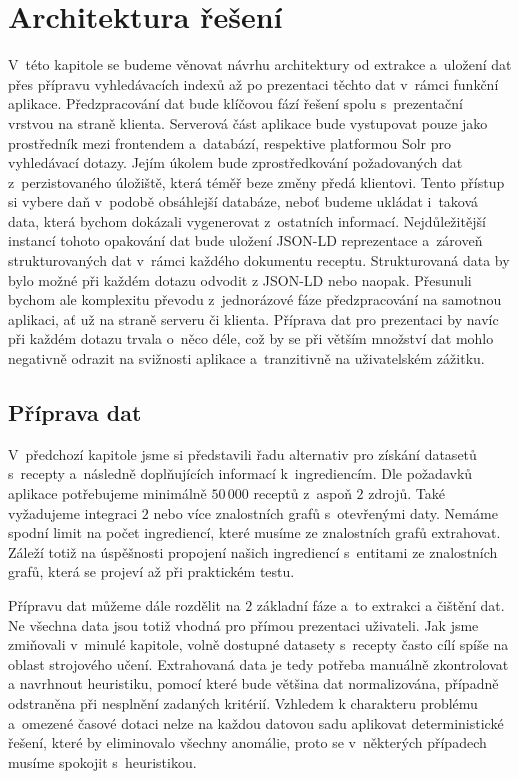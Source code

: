 
\chapter{Architektura řešení}

V~této kapitole se budeme věnovat návrhu architektury od extrakce a~uložení dat přes přípravu vyhledávacích indexů až po prezentaci těchto dat v~rámci funkční aplikace. Předzpracování dat bude klíčovou fází řešení spolu s~prezentační vrstvou na straně klienta. Serverová část aplikace bude vystupovat pouze jako prostředník mezi frontendem a~databází, respektive platformou Solr pro vyhledávací dotazy. Jejím úkolem bude zprostředkování požadovaných dat z~perzistovaného úložiště, která téměř beze změny předá klientovi. Tento přístup si vybere daň v~podobě obsáhlejší databáze, neboť budeme ukládat i~taková data, která bychom dokázali vygenerovat z~ostatních informací. Nejdůležitější instancí tohoto opakování dat bude uložení JSON-LD reprezentace a~zároveň strukturovaných dat v~rámci každého dokumentu receptu. Strukturovaná data by bylo možné při každém dotazu odvodit z JSON-LD nebo naopak. Přesunuli bychom ale komplexitu převodu z~jednorázové fáze předzpracování na samotnou aplikaci, ať už na straně serveru či klienta. Příprava dat pro prezentaci by navíc při každém dotazu trvala o~něco déle, což by se při větším množství dat mohlo negativně odrazit na svižnosti aplikace a~tranzitivně na uživatelském zážitku.

\section{Příprava dat}

V~předchozí kapitole jsme si představili řadu alternativ pro získání datasetů s~recepty a~následně doplňujících informací k~ingrediencím. Dle požadavků aplikace potřebujeme minimálně $50\,000$ receptů z~aspoň $2$ zdrojů. Také vyžadujeme integraci $2$ nebo více znalostních grafů s~otevřenými daty. Nemáme spodní limit na počet ingrediencí, které musíme ze znalostních grafů extrahovat. Záleží totiž na úspěšnosti propojení našich ingrediencí s~entitami ze znalostních grafů, která se projeví až při praktickém testu.

Přípravu dat můžeme dále rozdělit na $2$ základní fáze a~to extrakci a čištění dat. Ne všechna data jsou totiž vhodná pro přímou prezentaci uživateli. Jak jsme zmiňovali v~minulé kapitole, volně dostupné datasety s~recepty často cílí spíše na oblast strojového učení. Extrahovaná data je tedy potřeba manuálně zkontrolovat a navrhnout heuristiku, pomocí které bude většina dat normalizována, případně odstraněna při nesplnění zadaných kritérií. Vzhledem k charakteru problému a~omezené časové dotaci nelze na každou datovou sadu aplikovat deterministické řešení, které by eliminovalo všechny anomálie, proto se v~některých případech musíme spokojit s~heuristikou.

